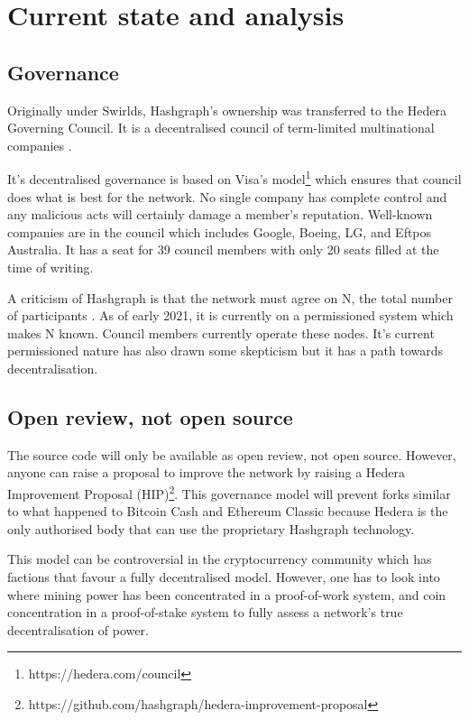 \section{Current state and analysis}

\subsection{Governance}
Originally under Swirlds, Hashgraph's ownership was transferred to the Hedera Governing Council. It is a decentralised council of term-limited multinational companies \cite{baird2018hedera}. 

It's decentralised governance is based on Visa's model\footnote{https://hedera.com/council} which ensures that council does what is best for the network. No single company has complete control and any malicious acts will certainly damage a member's reputation. Well-known companies are in the council which includes Google, Boeing, LG, and Eftpos Australia. It has a seat for 39 council members with only 20 seats filled at the time of writing.

A criticism of Hashgraph is that the network must agree on N, the total number of participants \cite{kauflin2018}. As of early 2021, it is currently on a permissioned system which makes N known. Council members currently operate these nodes. It's current permissioned nature has also drawn some skepticism but it has a path towards decentralisation.


\subsection{Open review, not open source}
The source code will only be available as open review, not open source. However, anyone can raise a proposal to improve the network by raising a Hedera Improvement Proposal (HIP)\footnote{https://github.com/hashgraph/hedera-improvement-proposal}. This governance model will prevent forks similar to what happened to Bitcoin Cash and Ethereum Classic because Hedera is the only authorised body that can use the proprietary Hashgraph technology.

This model can be controversial in the cryptocurrency community which has factions that favour a fully decentralised model. However, one has to look into where mining power has been concentrated in a proof-of-work system, and coin concentration in a proof-of-stake system to fully assess a network's true decentralisation of power.

